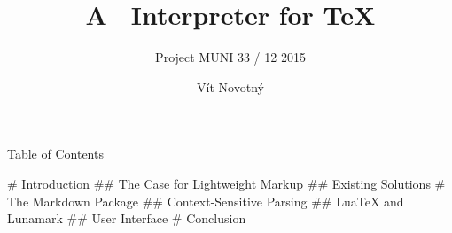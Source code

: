 \documentclass{beamer}
\title{A \raisebox{-1.7mm}{\texttt{[image: markdown-mark]}}\ Interpreter for \TeX}
\subtitle{Project MUNI 33 / 12 2015}
\author{Vít Novotný}
\begin{document}
\frame{\maketitle}


\begin{darkframes}
\begin{frame}{Table of Contents}
  \tableofcontents
\end{frame}
\begin{markdown}
# Introduction
## The Case for Lightweight Markup
## Existing Solutions
# The Markdown Package
## Context-Sensitive Parsing
## Lua\TeX{} and Lunamark
## User Interface
# Conclusion
\end{markdown}
\end{darkframes}
\end{document}
